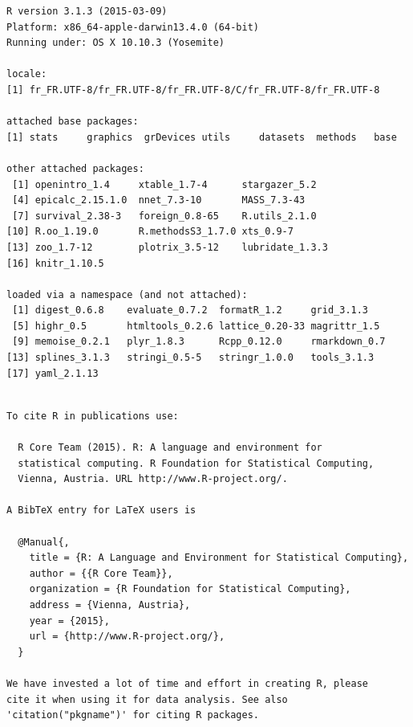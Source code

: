 \documentclass[]{article}
\begin{document}
\begin{verbatim}
R version 3.1.3 (2015-03-09)
Platform: x86_64-apple-darwin13.4.0 (64-bit)
Running under: OS X 10.10.3 (Yosemite)

locale:
[1] fr_FR.UTF-8/fr_FR.UTF-8/fr_FR.UTF-8/C/fr_FR.UTF-8/fr_FR.UTF-8

attached base packages:
[1] stats     graphics  grDevices utils     datasets  methods   base     

other attached packages:
 [1] openintro_1.4     xtable_1.7-4      stargazer_5.2    
 [4] epicalc_2.15.1.0  nnet_7.3-10       MASS_7.3-43      
 [7] survival_2.38-3   foreign_0.8-65    R.utils_2.1.0    
[10] R.oo_1.19.0       R.methodsS3_1.7.0 xts_0.9-7        
[13] zoo_1.7-12        plotrix_3.5-12    lubridate_1.3.3  
[16] knitr_1.10.5     

loaded via a namespace (and not attached):
 [1] digest_0.6.8    evaluate_0.7.2  formatR_1.2     grid_3.1.3     
 [5] highr_0.5       htmltools_0.2.6 lattice_0.20-33 magrittr_1.5   
 [9] memoise_0.2.1   plyr_1.8.3      Rcpp_0.12.0     rmarkdown_0.7  
[13] splines_3.1.3   stringi_0.5-5   stringr_1.0.0   tools_3.1.3    
[17] yaml_2.1.13    
\end{verbatim}

\begin{verbatim}

To cite R in publications use:

  R Core Team (2015). R: A language and environment for
  statistical computing. R Foundation for Statistical Computing,
  Vienna, Austria. URL http://www.R-project.org/.

A BibTeX entry for LaTeX users is

  @Manual{,
    title = {R: A Language and Environment for Statistical Computing},
    author = {{R Core Team}},
    organization = {R Foundation for Statistical Computing},
    address = {Vienna, Austria},
    year = {2015},
    url = {http://www.R-project.org/},
  }

We have invested a lot of time and effort in creating R, please
cite it when using it for data analysis. See also
'citation("pkgname")' for citing R packages.
\end{verbatim}
\end{document}
